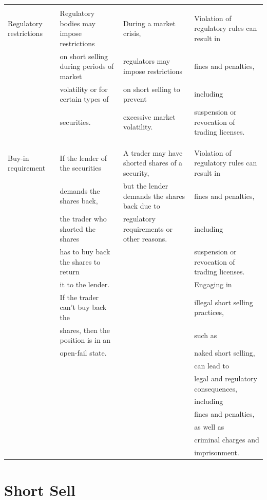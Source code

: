 \documentclass[11pt]{article}
\begin{document}
\begin{center}
\begin{tabular}{llll}
 &  &  & \\[0pt]
Regulatory restrictions & Regulatory bodies may impose restrictions & During a market crisis, & Violation of regulatory rules can result in\\[0pt]
 & on short selling during periods of market & regulators may impose restrictions & fines and penalties,\\[0pt]
 & volatility or for certain types of & on short selling to prevent & including\\[0pt]
 & securities. & excessive market volatility. & suspension or revocation of trading licenses.\\[0pt]
 &  &  & \\[0pt]
 &  &  & \\[0pt]
 &  &  & \\[0pt]
Buy-in requirement & If the lender of the securities & A trader may have shorted shares of a security, & Violation of regulatory rules can result in\\[0pt]
 & demands the shares back, & but the lender demands the shares back due to & fines and penalties,\\[0pt]
 & the trader who shorted the shares & regulatory requirements or other reasons. & including\\[0pt]
 & has to buy back the shares to return &  & suspension or revocation of trading licenses.\\[0pt]
 & it to the lender. &  & Engaging in\\[0pt]
 & If the trader can't buy back the &  & illegal short selling practices,\\[0pt]
 & shares, then the position is in an &  & such as\\[0pt]
 & open-fail state. &  & naked short selling,\\[0pt]
 &  &  & can lead to\\[0pt]
 &  &  & legal and regulatory consequences,\\[0pt]
 &  &  & including\\[0pt]
 &  &  & fines and penalties,\\[0pt]
 &  &  & as well as\\[0pt]
 &  &  & criminal charges and\\[0pt]
 &  &  & imprisonment.\\[0pt]
\hline
\end{tabular}
\end{center}

\section{Short Sell}
\label{sec:org54fab57}
\end{document}
